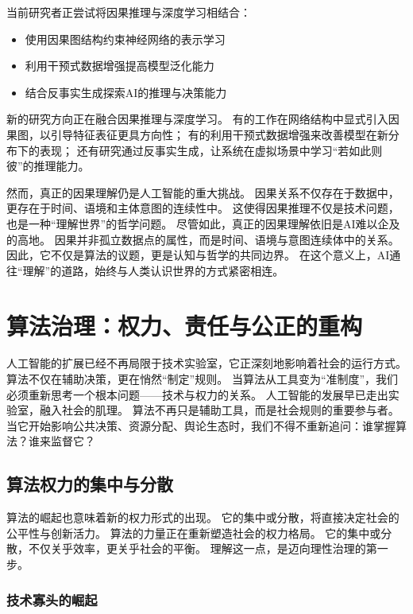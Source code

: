 当前研究者正尝试将因果推理与深度学习相结合：
\begin{itemize}
\item 使用因果图结构约束神经网络的表示学习
\item 利用干预式数据增强提高模型泛化能力
\item 结合反事实生成探索AI的推理与决策能力
\end{itemize}
新的研究方向正在融合因果推理与深度学习。
有的工作在网络结构中显式引入因果图，以引导特征表征更具方向性；
有的利用干预式数据增强来改善模型在新分布下的表现；
还有研究通过反事实生成，让系统在虚拟场景中学习“若如此则彼”的推理能力。

然而，真正的因果理解仍是人工智能的重大挑战。
因果关系不仅存在于数据中，更存在于时间、语境和主体意图的连续性中。
这使得因果推理不仅是技术问题，也是一种“理解世界”的哲学问题。
尽管如此，真正的因果理解依旧是AI难以企及的高地。
因果并非孤立数据点的属性，而是时间、语境与意图连续体中的关系。
因此，它不仅是算法的议题，更是认知与哲学的共同边界。
在这个意义上，AI通往“理解”的道路，始终与人类认识世界的方式紧密相连。

\section{算法治理：权力、责任与公正的重构}

人工智能的扩展已经不再局限于技术实验室，它正深刻地影响着社会的运行方式。  
算法不仅在辅助决策，更在悄然“制定”规则。  
当算法从工具变为“准制度”，我们必须重新思考一个根本问题——技术与权力的关系。  
人工智能的发展早已走出实验室，融入社会的肌理。  
算法不再只是辅助工具，而是社会规则的重要参与者。  
当它开始影响公共决策、资源分配、舆论生态时，我们不得不重新追问：谁掌握算法？谁来监督它？

\subsection{算法权力的集中与分散}

算法的崛起也意味着新的权力形式的出现。  
它的集中或分散，将直接决定社会的公平性与创新活力。  
算法的力量正在重新塑造社会的权力格局。  
它的集中或分散，不仅关乎效率，更关乎社会的平衡。  
理解这一点，是迈向理性治理的第一步。

\subsubsection{技术寡头的崛起}

